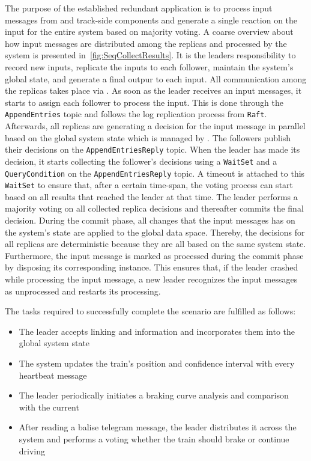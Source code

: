 The purpose of the established redundant application is to process input messages from  and track-side components and generate a single reaction on the input for the entire system based on majority voting.
A coarse overview about how input messages are distributed among the replicas and processed by the system is presented in~\autoref{fig:SeqCollectResults}.
It is the leaders responsibility to record new inputs, replicate the inputs to each follower, maintain the system's global state, and generate a final outpur to each input.
All communication among the replicas takes place via .
As soon as the leader receives an input messages, it starts to assign each follower to process the input.
This is done through the \texttt{AppendEntries} topic and follows the log replication process from \texttt{Raft}.
Afterwards, all replicas are generating a decision for the input message in parallel based on the global system state which is managed by .
The followers publish their decisions on the \texttt{AppendEntriesReply} topic.
When the leader has made its decision, it starts collecting the follower's decisions using a \texttt{WaitSet} and a \texttt{QueryCondition} on the \texttt{AppendEntriesReply} topic.
A timeout is attached to this \texttt{WaitSet} to ensure that, after a certain time-span, the voting process can start based on all results that reached the leader at that time.
The leader performs a majority voting on all collected replica decisions and thereafter commits the final decision.
During the commit phase, all changes that the input messages has on the system's state are applied to the global data space.
Thereby, the decisions for all replicas are deterministic because they are all based on the same system state.
Furthermore, the input message is marked as processed during the commit phase by disposing its corresponding  instance.
This ensures that, if the leader crashed while processing the input message, a new leader recognizes the input messages as unprocessed and restarts its processing.

The tasks required to successfully complete the scenario are fulfilled as follows:

\begin{itemize}
\item The leader accepts linking and  information and incorporates them into the global system state
\item The system updates the train's position and confidence interval with every heartbeat message
\item The leader periodically initiates a braking curve analysis and comparison with the current 
\item After reading a balise telegram message, the leader distributes it across the system and performs a voting whether the train should brake or continue driving
\end{itemize}

